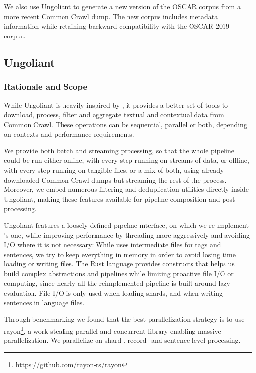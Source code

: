 We also use Ungoliant to generate a new version of the OSCAR corpus from a more recent Common Crawl dump. The new corpus includes metadata information while retaining backward compatibility with the OSCAR 2019 corpus.


\subsection{Ungoliant}

\subsubsection{Rationale and Scope}
\label{subsubsec:rationale}
While Ungoliant is heavily inspired by \goclassy, it provides a better set of tools to download, process, filter and aggregate textual and contextual data from Common Crawl. These operations can be sequential, parallel or both, depending on contexts and performance requirements.

We provide both batch and streaming processing, so that the whole pipeline could be run either online, with every step running on streams of data, or offline, with every step running on tangible files, or a mix of both, using already downloaded Common Crawl dumps but streaming the rest of the process. Moreover, we embed numerous filtering and deduplication utilities directly inside Ungoliant, making these features available for pipeline composition and post-processing.

Ungoliant features a loosely defined pipeline interface, on which we re-implement \goclassy's one, while improving performance by threading more aggressively and avoiding I/O where it is not necessary: While \goclassy uses intermediate files for tags and sentences, we try to keep everything in memory in order to avoid losing time loading or writing files. The Rust language provides constructs that helps us build complex abstractions and pipelines while limiting proactive file I/O or computing, since nearly all the reimplemented pipeline is built around lazy evaluation. File I/O is only used when loading shards, and when writing sentences in language files.

Through benchmarking we found that the best parallelization strategy is to use rayon\footnote{\url{https://github.com/rayon-rs/rayon}}, a work-stealing \cite{blumofe-etal-1999-scheduling} parallel and concurrent library enabling massive parallelization. We parallelize on \mbox{shard-,} record- and sentence-level processing.

